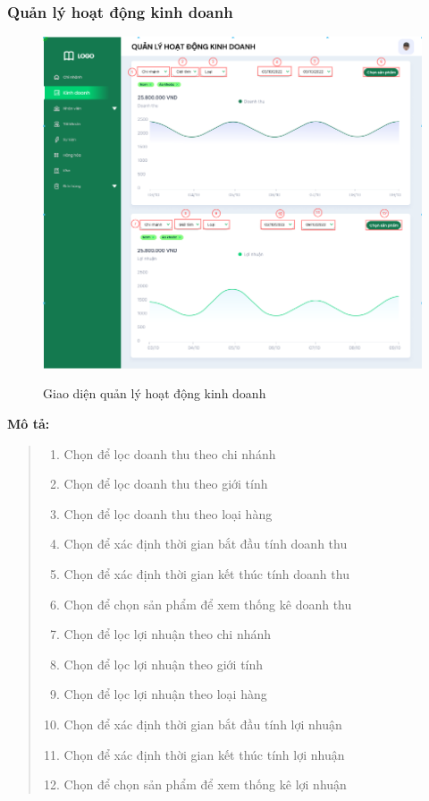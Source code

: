     \subsubsection{Quản lý hoạt động kinh doanh}
        \begin{figure}[!htp]
            \centering
            \includegraphics[width=12cm]{img/UI/admin/business.png}
            \label{22}
            \newline
            \caption{Giao diện quản lý hoạt động kinh doanh}
        \end{figure}
        \textbf{Mô tả:}  
        \begin{quote}
            \begin{enumerate}
                \item Chọn để lọc doanh thu theo chi nhánh 
                \item Chọn để lọc doanh thu theo giới tính
                \item Chọn để lọc doanh thu theo loại hàng
                \item Chọn để xác định  thời gian bắt đầu tính doanh thu
                \item Chọn để xác định thời gian kết thúc tính doanh thu
                \item Chọn để chọn sản phẩm để xem thống kê doanh thu
                \item Chọn để lọc lợi nhuận theo chi nhánh 
                \item Chọn để lọc lợi nhuận theo giới tính
                \item Chọn để lọc lợi nhuận theo loại hàng
                \item Chọn để xác định  thời gian bắt đầu tính lợi nhuận
                \item Chọn để xác định thời gian kết thúc tính lợi nhuận
                \item Chọn để chọn sản phẩm để xem thống kê lợi nhuận
            \end{enumerate}
        \end{quote}
    
